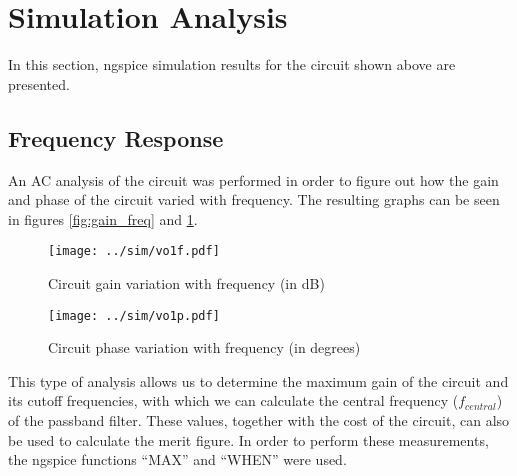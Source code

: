 \newpage
\section{Simulation Analysis}
\label{sec:simulation}

In this section, ngspice simulation results for the circuit shown above are presented.


\subsection{Frequency Response}

An AC analysis of the circuit was performed in order to figure out how the gain and phase of the circuit varied with frequency. The resulting graphs can be seen in figures \ref{fig:gain_freq} and \ref{fig:phase_freq}.


\begin{figure}[H]
\centering
\begin{minipage}[H]{0.45\linewidth}
{\texttt{[image: ../sim/vo1f.pdf]}}
\caption{Circuit gain variation with frequency (in dB)}
\label{fig:gain_freq}
\end{minipage}
\quad
\begin{minipage}[H]{0.45\linewidth}
\texttt{[image: ../sim/vo1p.pdf]}
\vspace{-4pt}
\caption{Circuit phase variation with frequency (in degrees)}
\label{fig:phase_freq}
\end{minipage}
\end{figure}




This type of analysis allows us to determine the maximum gain of the circuit and its cutoff frequencies, with which we can calculate the central frequency ($f_{central}$) of the passband filter. These values, together with the cost of the circuit, can also be used to calculate the merit figure. In order to perform these measurements, the ngspice functions ``MAX'' and ``WHEN'' were used.

